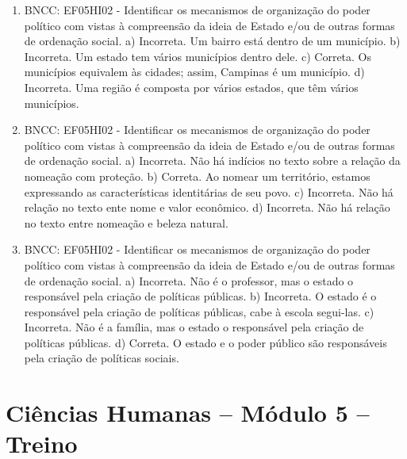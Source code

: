 \begin{enumerate}
\item
BNCC: EF05HI02 - Identificar os mecanismos de organização do
poder político com vistas à compreensão da ideia de Estado e/ou de
outras formas de ordenação social.
a) Incorreta. Um bairro está dentro de um município.
b) Incorreta. Um estado tem vários municípios dentro dele.
c) Correta. Os municípios equivalem às cidades; assim, Campinas é um
município.
d) Incorreta. Uma região é composta por vários estados, que têm vários
municípios.

\item
BNCC: EF05HI02 - Identificar os mecanismos de organização do
poder político com vistas à compreensão da ideia de Estado e/ou de
outras formas de ordenação social.
a) Incorreta. Não há indícios no texto sobre a relação da nomeação com
proteção.
b) Correta. Ao nomear um território, estamos expressando as
características identitárias de seu povo.
c) Incorreta. Não há relação no texto ente nome e valor econômico.
d) Incorreta. Não há relação no texto entre nomeação e beleza natural.

\item
BNCC: EF05HI02 - Identificar os mecanismos de organização do
poder político com vistas à compreensão da ideia de Estado e/ou de
outras formas de ordenação social.
a) Incorreta. Não é o professor, mas o estado o responsável pela criação
de políticas públicas.
b) Incorreta. O estado é o responsável pela criação de políticas
públicas, cabe à escola segui-las.
c) Incorreta. Não é a família, mas o estado o responsável pela criação
de políticas públicas.
d) Correta. O estado e o poder público são responsáveis pela criação de
políticas sociais.
\end{enumerate}

\section*{Ciências Humanas – Módulo 5 – Treino}

